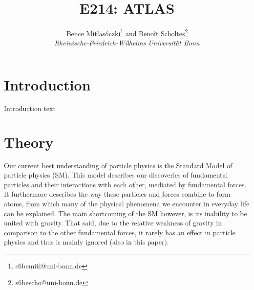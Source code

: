 \documentclass[twocolumn]{article}
\title{\textbf{E214: ATLAS}}
\author{Bence Mitlasóczki\thanks{s6bemitl@uni-bonn.de} and Beno\^it Scholtes\thanks{s6bescho@uni-bonn.de} \\ \textit{Rheinische-Friedrich-Wilhelms Universit\"at Bonn}}
\begin{document}
\renewcommand{\abstractname}{\vspace{-\baselineskip}} %
\maketitle
\saythanks %
\section{Introduction}
Introduction text
\section{Theory}
Our current best understanding of particle physics is the Standard Model of particle physics (SM). This model describes our discoveries of fundamental particles and their interactions with each other, mediated by fundamental forces. It furthermore describes the way these particles and forces combine to form atoms, from which many of the physical phenomena we encounter in everyday life can be explained. The main shortcoming of the SM however, is its inability to be united with gravity. That said, due to the relative weakness of gravity in comparison to the other fundamental forces, it rarely has an effect in particle physics and thus is mainly ignored (also in this paper).
\end{document}
